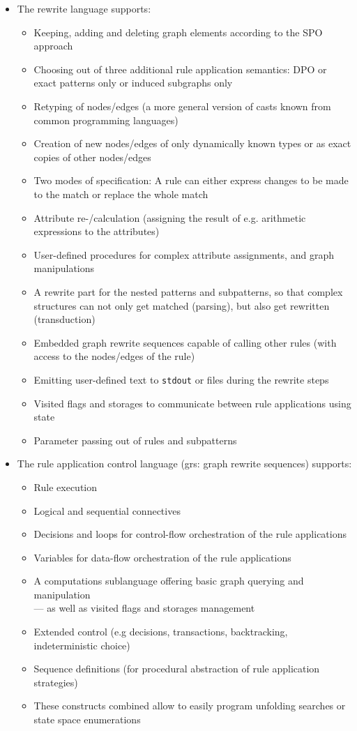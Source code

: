 \begin{itemize}
  \item The rewrite language supports:
  \begin{itemize}
    \item Keeping, adding and deleting graph elements according to the SPO approach
    \item Choosing out of three additional rule application semantics: DPO or exact patterns only or induced subgraphs only
    \item Retyping of nodes/edges (a more general version of casts known from common programming languages)
    \item Creation of new nodes/edges of only dynamically known types or as exact copies of other nodes/edges
    \item Two modes of specification: A rule can either express changes to be made to the match or replace the whole match
    \item Attribute re-/calculation (assigning the result of e.g. arithmetic expressions to the attributes)
    \item User-defined procedures for complex attribute assignments, and graph manipulations
    \item A rewrite part for the nested patterns and subpatterns, so that complex structures can not only get matched (parsing), but also get rewritten (transduction)
    \item Embedded graph rewrite sequences capable of calling other rules (with access to the nodes/edges of the rule)
    \item Emitting user-defined text to \texttt{stdout} or files during the rewrite steps
    \item Visited flags and storages to communicate between rule applications using state
    \item Parameter passing out of rules and subpatterns
  \end{itemize}

  \item The rule application control language (grs: graph rewrite sequences) supports:
  \begin{itemize}
    \item Rule execution
    \item Logical and sequential connectives
    \item Decisions and loops for control-flow orchestration of the rule applications
    \item Variables for data-flow orchestration of the rule applications
    \item A computations sublanguage offering basic graph querying and manipulation\\
     --- as well as visited flags and storages management
    \item Extended control (e.g decisions, transactions, backtracking, indeterministic choice)
    \item Sequence definitions (for procedural abstraction of rule application strategies)
    \item These constructs combined allow to easily program unfolding searches or state space enumerations
  \end{itemize}
\end{itemize}

